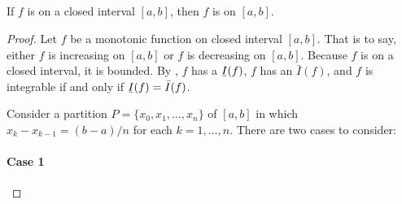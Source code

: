 \documentclass{report}
\begin{document}
\subsection{}%

  \begin{theorem}[1.12]
    If $f$ is  on a closed interval $[a, b]$, then $f$
      is  on $[a, b]$.
  \end{theorem}

  \begin{proof}

    Let $f$ be a monotonic function on closed interval $[a, b]$.
    That is to say, either $f$ is increasing on $[a, b]$ or $f$ is decreasing on
      $[a, b]$.
    Because $f$ is on a closed interval, it is bounded.
    By , $f$ has a 
      $\ubar{I}(f)$, $f$ has an  $\bar{I}(f)$,
      and $f$ is integrable if and only if $\ubar{I}(f) = \bar{I}(f)$.

    Consider a partition $P = \{x_0, x_1, \ldots, x_n\}$ of $[a, b]$ in which
      $x_k - x_{k-1} = (b - a) / n$ for each $k = 1, \ldots, n$.
    There are two cases to consider:

    \paragraph{Case 1}%


\end{proof}
\end{document}
